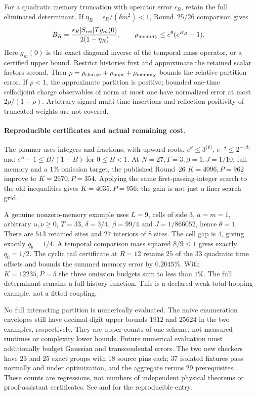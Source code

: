 For a quadratic memory truncation with operator error $\epsilon_R$,
retain the full eliminated determinant. If
$\eta_R=\epsilon_R/(\delta m^2)<1$, Round~25/26 comparison gives
\[
 B_R=\frac{\epsilon_R |S_{\rm ret}|Tg_m(0)}{2(1-\eta_R)},
 \qquad \rho_{\rm memory}\le e^\theta(e^{B_R}-1).
\]
Here $g_m(0)$ is the exact diagonal inverse of the temporal mass operator,
or a certified upper bound. Restrict histories first and approximate the
retained scalar factors second. Then
$\rho=\rho_{\rm charge}+\rho_{\rm hops}+\rho_{\rm memory}$ bounds the
relative partition error. If $\rho<1$, the approximate partition is positive;
bounded one-time selfadjoint charge observables of norm at most one have
normalized error at most $2\rho/(1-\rho)$. Arbitrary signed multi-time
insertions and reflection positivity of truncated weights are not covered.

\paragraph{Reproducible certificates and actual remaining cost.}
The planner uses integers and fractions, with upward roots,
$e^\theta\le3^{\lceil\theta\rceil}$,
$e^{-d}\le2^{-\lfloor d\rfloor}$ and
$e^B-1\le B/(1-B)$ for $0\le B<1$.
At $N=27,T=3,\beta=1,J=1/10$, full memory and a $1\%$ omission target,
the published Round~26 $K=4096,P=962$ improve to $K=2670,P=354$.
Applying the same first-passing-integer search to the old inequalities
gives $K=4035,P=956$: the gain is not just a finer search grid.

A genuine nonzero-memory example uses $L=9$, cells of side $3$, $a=m=1$,
arbitrary $u,\nu\ge0$, $T=33$, $\delta=3/4$, $\beta=99/4$ and
$J=1/866052$, hence $\theta=1$. There are $513$ retained sites and
$27$ interiors of $8$ sites. The cell gap is $4$, giving exactly
$q_b=1/4$. A temporal comparison mass squared $8/9\le1$ gives exactly
$q_0=1/2$. The cyclic tail certificate at $R=12$ retains $25$ of the
$33$ quadratic time offsets and bounds the summed memory error by
$0.2045\%$. With $K=12235,P=5$ the three omission budgets sum to less
than $1\%$. The full determinant remains a full-history function.
This is a declared weak-total-hopping example, not a fitted coupling.

No full interacting partition is numerically evaluated. The naive
enumeration envelopes still have decimal-digit upper bounds $1912$ and
$25624$ in the two examples, respectively. They are upper counts of one
scheme, not measured runtimes or complexity lower bounds. Future numerical
evaluation must additionally budget Gaussian and transcendental errors.
The two new checkers have $23$ and $25$ exact groups with $18$ source pins
each; $37$ isolated fixtures pass normally and under optimization, and
the aggregate reruns $29$ prerequisites. These counts are regressions,
not numbers of independent physical theorems or proof-assistant certificates.
See  and
 for the reproducible entry.

